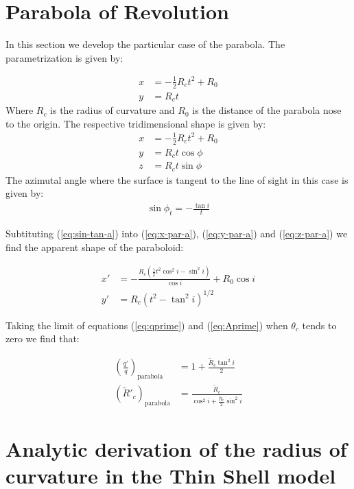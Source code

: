 \appendix
\section{Parabola of Revolution}
\label{app:parabola}

In this section we develop the particular case of the parabola.
The parametrization is given by:

\begin{align}
x &= - \frac{1}{2}R_ct^2 + R_0 \\
y &= R_c t
\end{align}
Where $R_c$ is the radius of curvature and $R_0$ is the distance of the parabola nose to the
origin.
The respective tridimensional shape is given by:
\begin{align}
x &= -\frac{1}{2}R_ct^2 + R_0 \label{eq:x-par-a}\\
y &= R_c t \cos\phi  \label{eq:y-par-a}\\
z &= R_c t \sin\phi  \label{eq:z-par-a}
\end{align}
The azimutal angle where the surface is tangent to the line of sight in this case is given by:
\begin{align}
\sin\phi_t = -\frac{\tan i}{t} \label{eq:sin-tan-a} 
\end{align}

Subtituting (\ref{eq:sin-tan-a}) into (\ref{eq:x-par-a}), (\ref{eq:y-par-a}) and
(\ref{eq:z-par-a}) we find the apparent shape
of the paraboloid:

\begin{align}
x' &= -\frac{R_c(\frac{1}{2}t^2 \cos^2 i -\sin^2 i)}{\cos i}+R_0\cos i \\
y' &= R_c\left(t^2-\tan^2 i\right)^{1/2} 
\end{align}

Taking the limit of equations (\ref{eq:qprime}) and (\ref{eq:Aprime}) when $\theta_c$ tends to zero we find that:

\begin{align}
\left(\frac{q'}{q}\right)_{\mathrm{parabola}} &= 1+\frac{\tilde{R}_c\tan^2 i}{2}\\
\left(\tilde{R}'_c\right)_{\mathrm{parabola}} &= \frac{\tilde{R}_c}{\cos^2 i + \frac{\tilde{R}_c}{2}\sin^2 i}
\end{align}

\section{Analytic derivation of the radius of curvature in the Thin Shell model}
\label{app:rc-analytic}

